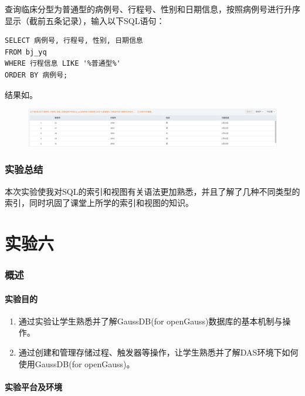 \documentclass[lang=cn,11pt,a4paper,cite=authornum]{paper}
\begin{document}
查询临床分型为普通型的病例号、行程号、性别和日期信息，按照病例号进行升序显示（截前五条记录），输入以下SQL语句：
\begin{code}
\begin{verbatim}
SELECT 病例号, 行程号, 性别, 日期信息
FROM bj_yq
WHERE 行程信息 LIKE '%普通型%'
ORDER BY 病例号;
\end{verbatim}
\end{code}

结果如。
\begin{figure}[!htb]
    \centering
    \includegraphics[width=\textwidth]{./images/res24.png}
    \caption{\label{fig:res24}}
\end{figure}

\section{实验总结}

本次实验使我对SQL的索引和视图有关语法更加熟悉，并且了解了几种不同类型的索引，同时巩固了课堂上所学的索引和视图的知识。

\part{实验六}

\section{概述}

\subsection{实验目的}

\begin{enumerate}
    \item 通过实验让学生熟悉并了解GaussDB(for openGauss)数据库的基本机制与操作。
    \item 通过创建和管理存储过程、触发器等操作，让学生熟悉并了解DAS环境下如何使用GaussDB(for openGauss)。
\end{enumerate}

\subsection{实验平台及环境}
\end{document}
